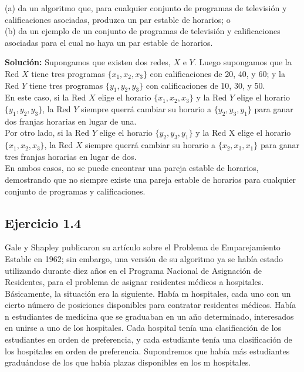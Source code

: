\documentclass{article}
\begin{document}
(a) da un algoritmo que, para cualquier conjunto de programas de televisión y calificaciones asociadas, produzca un par estable de horarios; o\\

(b) da un ejemplo de un conjunto de programas de televisión y calificaciones asociadas para el cual no haya un par estable de horarios.\\

\newpage

\textbf{Solución:} Supongamos que existen dos redes, $X$ e $Y$. Luego supongamos que la Red $X$ tiene tres programas $\{x_1, x_2, x_3\}$ con calificaciones de 20, 40, y 60; y la Red $Y$ tiene tres programas $\{y_1, y_2, y_3\}$ con calificaciones de 10, 30, y 50.\\

En este caso, si la Red $X$ elige el horario $\{x_1, x_2, x_3\}$ y la Red $Y$ elige el horario $\{y_1, y_2, y_3\}$, la Red $Y$ siempre querrá cambiar su horario a $\{y_2, y_3, y_1\}$ para ganar dos franjas horarias en lugar de una.\\

Por otro lado, si la Red $Y$ elige el horario $\{y_2, y_3, y_1\}$ y la Red X elige el horario $\{x_1, x_2, x_3\}$, la Red $X$ siempre querrá cambiar su horario a $\{x_2, x_3, x_1\}$ para ganar tres franjas horarias en lugar de dos.\\

En ambos casos, no se puede encontrar una pareja estable de horarios, demostrando que no siempre existe una pareja estable de horarios para cualquier conjunto de programas y calificaciones.


\subsection{Ejercicio 1.4}
Gale y Shapley publicaron su artículo sobre el Problema de Emparejamiento Estable en 1962; sin embargo, una versión de su algoritmo ya se había estado utilizando durante diez años en el Programa Nacional de Asignación de Residentes, para el problema de asignar residentes médicos a hospitales.\\

Básicamente, la situación era la siguiente. Había m hospitales, cada uno con un cierto número de posiciones disponibles para contratar residentes médicos. Había n estudiantes de medicina que se graduaban en un año determinado, interesados en unirse a uno de los hospitales. Cada hospital tenía una clasificación de los estudiantes en orden de preferencia, y cada estudiante tenía una clasificación de los hospitales en orden de preferencia. Supondremos que había más estudiantes graduándose de los que había plazas disponibles en los m hospitales.\\
\end{document}
